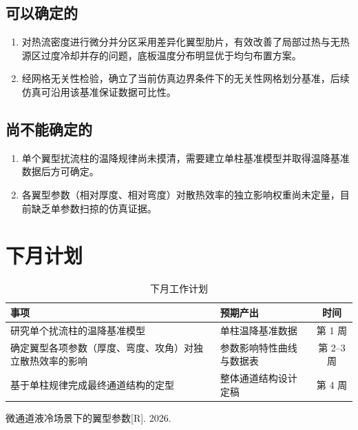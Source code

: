 \documentclass[stage2]{ydzjreport}
\begin{document}
\subsection{可以确定的}

\begin{enumerate}
  \item 对热流密度进行微分并分区采用差异化翼型肋片，有效改善了局部过热与无热源区过度冷却并存的问题，底板温度分布明显优于均匀布置方案。
  \item 经网格无关性检验，确立了当前仿真边界条件下的无关性网格划分基准，后续仿真可沿用该基准保证数据可比性。
\end{enumerate}

\subsection{尚不能确定的}

\begin{enumerate}
  \item 单个翼型扰流柱的温降规律尚未摸清，需要建立单柱基准模型并取得温降基准数据后方可确定。
  \item 各翼型参数（相对厚度、相对弯度）对散热效率的独立影响权重尚未定量，目前缺乏单参数扫掠的仿真证据。
\end{enumerate}


\section{下月计划}

\begin{table}[htbp]
\centering
\caption{下月工作计划}
\begin{tabularx}{\textwidth}{@{}Y Y c@{}}
\toprule
{} 事项 & 预期产出 & 时间 \\
\midrule
研究单个扰流柱的温降基准模型 & 单柱温降基准数据 & 第 1 周 \\
确定翼型各项参数（厚度、弯度、攻角）对独立散热效率的影响 & 参数影响特性曲线与数据表 & 第 2--3 周 \\
基于单柱规律完成最终通道结构的定型 & 整体通道结构设计定稿 & 第 4 周 \\
\bottomrule
\end{tabularx}
\end{table}


\begin{thebibliography}{9}
 微通道液冷场景下的翼型参数[R]. 2026.
\end{thebibliography}
\end{document}
